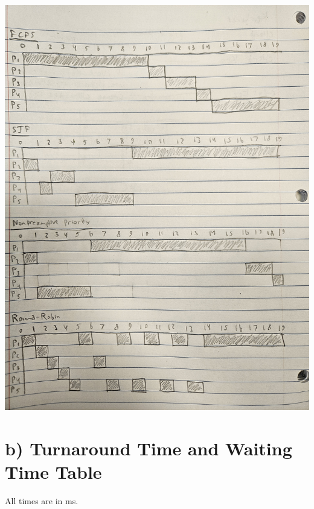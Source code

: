 \documentclass[letterpaper, 10pt,DIV=13]{scrartcl}
\numberwithin{equation}{section} %
\numberwithin{figure}{section} %
\numberwithin{table}{section} %
\begin{document}
\begin{center}
    \includegraphics[width=\textwidth, angle=-90]{gantt_charts.jpg}
\end{center}

\section*{b) Turnaround Time and Waiting Time Table}
All times are in ms.
\end{document}
